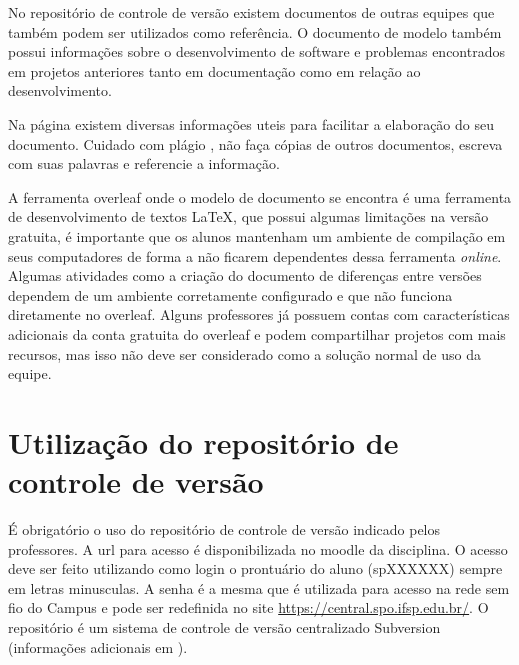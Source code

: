 No repositório de controle de versão existem documentos de outras equipes que também podem ser utilizados como referência. O documento de modelo também possui informações sobre o desenvolvimento de software e problemas encontrados em projetos anteriores tanto em documentação como em relação ao desenvolvimento. 

Na página  existem diversas informações uteis para facilitar a elaboração do seu documento. Cuidado com plágio , não faça cópias de outros documentos, escreva com suas palavras e referencie a informação.

A ferramenta overleaf onde o modelo de documento se encontra é uma ferramenta de desenvolvimento de textos \LaTeX, que possui algumas limitações na versão gratuita, é importante que os alunos mantenham um ambiente de compilação em seus computadores de forma a não ficarem dependentes dessa ferramenta \emph{online}. Algumas atividades como a criação do documento de diferenças entre versões  dependem de um ambiente corretamente configurado e que não funciona diretamente no overleaf. Alguns professores já possuem contas com características adicionais da conta gratuita do overleaf e podem compartilhar projetos com mais recursos, mas isso não deve ser considerado como a solução normal de uso da equipe.


\section{Utilização do repositório de controle de versão}
\label{atv-controle-de-versao}
É obrigatório o uso do repositório de controle de versão indicado pelos professores. A \ac{url} para acesso é disponibilizada no moodle da disciplina. O acesso deve ser feito utilizando como login o prontuário do aluno (spXXXXXX) sempre em letras minusculas. A senha é a mesma que é utilizada para acesso na rede sem fio do Campus e pode ser redefinida no site \url{https://central.spo.ifsp.edu.br/}. O repositório é um sistema de controle de versão centralizado Subversion (informações adicionais em ).

